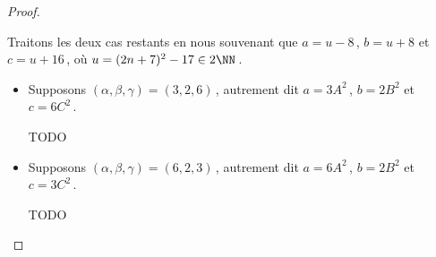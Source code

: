 \begin{proof}
	\begin{center}
	\end{center}


	Traitons les deux cas restants en nous souvenant que $a = u - 8$\,, $b = u + 8$ et $c = u + 16$\,, où $u = (2 n + 7)^2 - 17 \in 2 \NN$\,.
	
	\begin{itemize}
		\item Supposons $(\alpha, \beta, \gamma) = (3, 2, 6)$\,, 
		autrement dit 
		$a = 3 A^2$\,, $b = 2 B^2$ et $c = 6 C^2$\,.
		
		\smallskip
		\noindent
		TODO
		
		\item Supposons $(\alpha, \beta, \gamma) = (6, 2, 3)$\,, 
		autrement dit 
		$a = 6 A^2$\,, $b = 2 B^2$ et $c = 3 C^2$\,.
		
		\smallskip
		\noindent
		TODO
	\end{itemize}
\end{proof}

